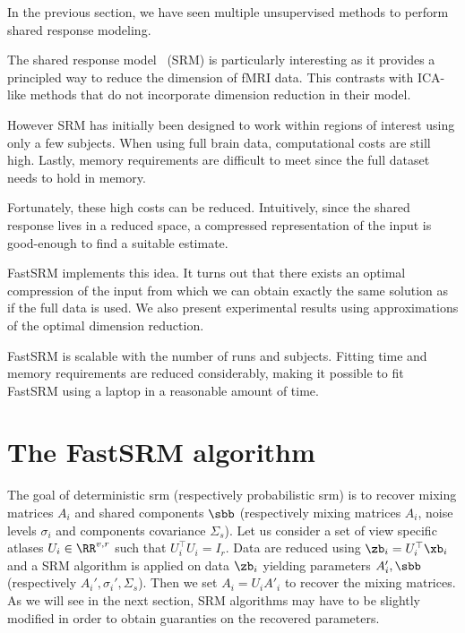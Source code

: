 In the previous section, we have seen multiple unsupervised methods to perform
shared response modeling.

The shared response model~\cite{chen2015reduced} (SRM) is particularly
interesting as it provides a principled way to reduce the
dimension of fMRI data. This contrasts with ICA-like methods that do not
incorporate dimension reduction in their model.

However SRM has initially been designed to work within regions of interest using
only a few subjects. When using full brain data, computational costs are still
high. Lastly, memory requirements are difficult to meet since the full dataset needs to hold
in memory.

Fortunately, these high costs can be reduced. Intuitively, since the shared
response lives in a reduced space, a compressed representation of the input is
good-enough to find a suitable estimate.

FastSRM implements this idea. It turns out that there exists an optimal
compression of the input from which we can obtain exactly the same solution as
if the full data is used. We also present experimental results using
approximations of the optimal dimension reduction.

FastSRM is scalable with the number of runs and subjects. Fitting time and memory requirements are reduced considerably, making it possible to fit FastSRM using a laptop in a reasonable amount of time.

\section{The FastSRM algorithm}
The goal of deterministic srm (respectively probabilistic srm) is to recover mixing matrices $A_i$ and shared
components $\sbb$ (respectively mixing matrices $A_i$, noise levels
$\sigma_i$ and components covariance $\Sigma_s$). 
Let us consider a set of view specific atlases $U_i \in \RR^{v, r}$ such that
$U_i^{\top}U_i = I_r$.
Data are reduced using $\zb_i = U_i^{\top} \xb_i$ and a SRM algorithm is applied
on data $\zb_i$ yielding parameters $A_i', \sbb$ (respectively $A_i',
\sigma_i', \Sigma_s$). Then we set $A_i = U_i A'_i$ to recover the mixing matrices.
As we will see in the next section, SRM algorithms may have to be slightly
modified in order to obtain guaranties on the recovered parameters.


